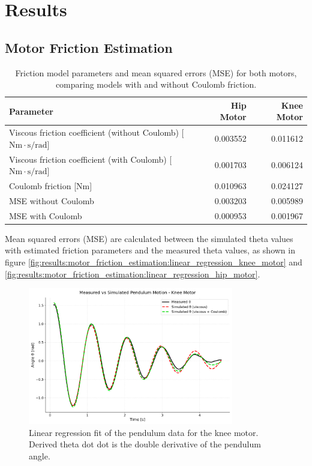 \section{Results}
\label{sec:results}

\subsection{Motor Friction Estimation}
\label{sec:results:motor_friction_estimation}
  

\begin{table}[h]
    \centering
    \begin{tabular}{lrr}
        \hline
        Parameter & Hip Motor & Knee Motor \\
        \hline
        Viscous friction coefficient (without Coulomb) [$\mathrm{Nm \cdot s/rad}$] & 0.003552 & 0.011612 \\
        Viscous friction coefficient (with Coulomb) [$\mathrm{Nm \cdot s/rad}$] & 0.001703 & 0.006124 \\
        Coulomb friction [Nm] & 0.010963 & 0.024127 \\
        MSE without Coulomb & 0.003203 & 0.005989 \\
        MSE with Coulomb & 0.000953 & 0.001967 \\
        \hline
    \end{tabular}
    \caption{Friction model parameters and mean squared errors (MSE) for both motors, comparing models with and without Coulomb friction.}
    \label{tab:results:motor_friction_parameters}
\end{table}

Mean squared errors (MSE) are calculated between the simulated theta values with estimated friction parameters and the measured theta values, as shown in figure \ref{fig:results:motor_friction_estimation:linear_regression_knee_motor} and \ref{fig:results:motor_friction_estimation:linear_regression_hip_motor}.



\begin{figure}[h]
    \centering
    \includegraphics[width=0.8\textwidth]{Images/results/pendulum_large.png}
    \caption{Linear regression fit of the pendulum data for the knee motor. Derived theta dot dot is the double derivative of the pendulum angle.}
    \label{fig:results:motor_friction_estimation:pendulum_large}
\end{figure}

